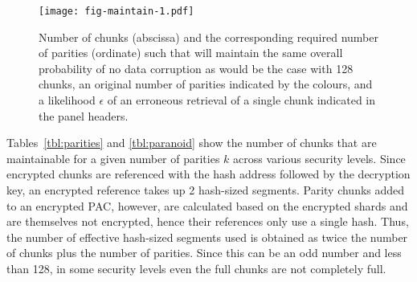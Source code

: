 \documentclass[a4paper,11pt]{article}
\begin{document}
\begin{figure}[!ht]
  \centering
  \texttt{[image: fig-maintain-1.pdf]}
  \caption{Number of chunks (abscissa) and the corresponding required number of parities (ordinate) such that will maintain the same overall probability of no data corruption as would be the case with 128 chunks, an original number of parities indicated by the colours, and a likelihood $\epsilon$ of an erroneous retrieval of a single chunk indicated in the panel headers.}
  \label{fig:maintain}
\end{figure}

Tables~\ref{tbl:parities} and \ref{tbl:paranoid} show 
the number of chunks that are maintainable for a given number of parities $k$ across various security levels.
Since encrypted chunks are referenced with the hash address followed by the decryption key, an encrypted reference takes up 2 hash-sized segments. Parity chunks added to an encrypted PAC, however, are calculated based on the encrypted shards and are themselves not encrypted, hence their references only use a single hash. 
Thus, the number of effective hash-sized segments 
used is obtained as twice the number of chunks plus the number of parities. Since this can be an odd number and less than 128, in some security levels even the full chunks are not completely full.
\end{document}
